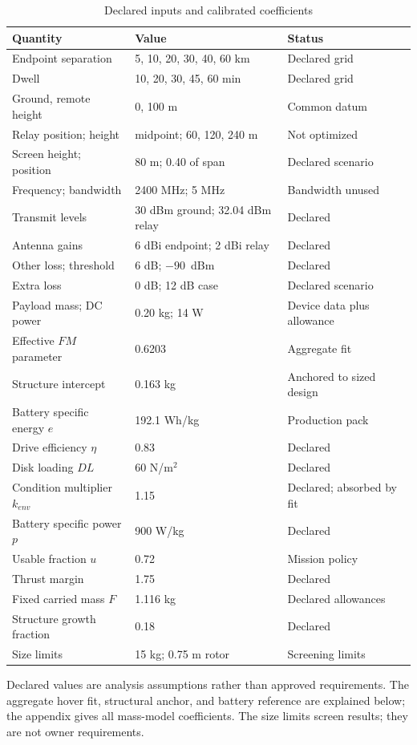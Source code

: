 \documentclass[twocolumn,letterpaper]{IEEEAerospaceCLS}
\begin{document}
\begin{table}[!tb]
\caption{Declared inputs and calibrated coefficients}
\label{tab:inputs}
\centering\small
\begin{tabular}{@{}L{1.15in}L{0.85in}L{0.85in}@{}}
\toprule
Quantity & Value & Status \\
\midrule
Endpoint separation & 5, 10, 20, 30, 40, 60 km & Declared grid \\
Dwell & 10, 20, 30, 45, 60 min & Declared grid \\
Ground, remote height & 0, 100 m & Common datum \\
Relay position; height & midpoint; 60, 120, 240 m & Not optimized \\
Screen height; position & 80 m; 0.40 of span & Declared scenario \\
Frequency; bandwidth & 2400 MHz; 5 MHz & Bandwidth unused \\
Transmit levels & 30 dBm ground; 32.04 dBm relay & Declared \\
Antenna gains & 6 dBi endpoint; 2 dBi relay & Declared \\
Other loss; threshold & 6 dB; $-90$~dBm & Declared \\
Extra loss & 0 dB; 12 dB case & Declared scenario \\
Payload mass; DC power & 0.20 kg; 14 W & Device data plus allowance \\
\midrule
Effective $FM$ parameter & 0.6203 & Aggregate fit \cite{nasatm} \\
Structure intercept & 0.163 kg & Anchored to sized design \cite{russell2018} \\
Battery specific energy $e$ & 192.1 Wh/kg & Production pack \cite{djim30} \\
Drive efficiency $\eta$ & 0.83 & Declared \\
Disk loading $DL$ & 60 N/m$^2$ & Declared \\
Condition multiplier $k_{env}$ & 1.15 & Declared; absorbed by fit \\
Battery specific power $p$ & 900 W/kg & Declared \\
Usable fraction $u$ & 0.72 & Mission policy \\
Thrust margin & 1.75 & Declared \\
Fixed carried mass $F$ & 1.116 kg & Declared allowances \\
Structure growth fraction & 0.18 & Declared \\
Size limits & 15 kg; 0.75 m rotor & Screening limits \\
\bottomrule
\end{tabular}

\vspace{2pt}
\begin{minipage}{\columnwidth}\footnotesize
Declared values are analysis assumptions rather than approved requirements. The aggregate hover fit, structural anchor, and battery reference are explained below; the appendix gives all mass-model coefficients. The size limits screen results; they are not owner requirements.
\end{minipage}
\end{table}
\end{document}

